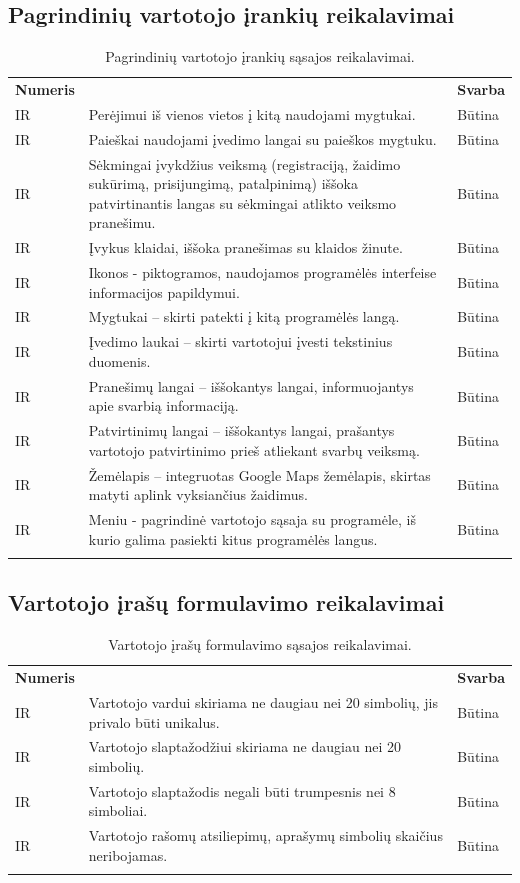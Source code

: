 \documentclass{VUMIFPSkursinis}
\begin{document}
\newcommand\rownumberir{\stepcounter{ircount}\arabic{ircount}}

\subsection{Pagrindinių vartotojo įrankių reikalavimai}
\begin{longtable}{ | >{\centering}m{2cm} | m{10cm} | >{\centering}m{2.5cm} | } \hline
\multicolumn{3}{ |l| }{\textbf{Pagrindinių vartotojo įrankių reikalavimai}} \tabularnewline \hline
\textbf{Numeris} & \centering{\textbf{Reikalavimas}} & \textbf{Svarba} \tabularnewline \hline
IR\rownumberir & Perėjimui iš vienos vietos į kitą naudojami mygtukai. & Būtina\tabularnewline \hline
IR\rownumberir & Paieškai naudojami įvedimo langai su paieškos mygtuku. & Būtina\tabularnewline \hline
IR\rownumberir & Sėkmingai įvykdžius veiksmą (registraciją, žaidimo sukūrimą, prisijungimą, patalpinimą) iššoka patvirtinantis langas su sėkmingai atlikto veiksmo pranešimu. & Būtina\tabularnewline \hline
IR\rownumberir & Įvykus klaidai, iššoka pranešimas su klaidos žinute. & Būtina\tabularnewline \hline
IR\rownumberir & Ikonos - piktogramos, naudojamos programėlės interfeise informacijos papildymui. & Būtina\tabularnewline \hline
IR\rownumberir & Mygtukai – skirti patekti į kitą programėlės langą. & Būtina\tabularnewline \hline
IR\rownumberir & Įvedimo laukai – skirti vartotojui įvesti tekstinius duomenis. & Būtina\tabularnewline \hline
IR\rownumberir & Pranešimų langai – iššokantys langai, informuojantys apie svarbią informaciją. & Būtina\tabularnewline \hline
IR\rownumberir & Patvirtinimų langai – iššokantys langai, prašantys vartotojo patvirtinimo prieš atliekant svarbų veiksmą. & Būtina\tabularnewline \hline
IR\rownumberir & Žemėlapis – integruotas Google Maps žemėlapis, skirtas matyti aplink vyksiančius žaidimus. & Būtina\tabularnewline \hline
IR\rownumberir & Meniu - pagrindinė vartotojo sąsaja su programėle, iš kurio galima pasiekti kitus programėlės langus. & Būtina\tabularnewline \hline
\caption{Pagrindinių vartotojo įrankių sąsajos reikalavimai.}
\end{longtable}

\subsection{Vartotojo įrašų formulavimo reikalavimai}
\begin{longtable}{ | >{\centering}m{2cm} | m{10cm} | >{\centering}m{2.5cm} | } \hline
\multicolumn{3}{ |l| }{\textbf{Vartotojo įrašų formulavimo reikalavimai}} \tabularnewline \hline
\textbf{Numeris} & \centering{\textbf{Reikalavimas}} & \textbf{Svarba} \tabularnewline \hline
IR\rownumberir & Vartotojo vardui skiriama ne daugiau nei 20 simbolių, jis privalo būti unikalus. & Būtina\tabularnewline \hline
IR\rownumberir & Vartotojo slaptažodžiui skiriama ne daugiau nei 20 simbolių. & Būtina\tabularnewline \hline
IR\rownumberir & Vartotojo slaptažodis negali būti trumpesnis nei 8 simboliai. & Būtina\tabularnewline \hline
IR\rownumberir & Vartotojo rašomų atsiliepimų, aprašymų simbolių skaičius neribojamas. & Būtina\tabularnewline \hline
\caption{Vartotojo įrašų formulavimo sąsajos reikalavimai.}
\end{longtable}
\end{document}
